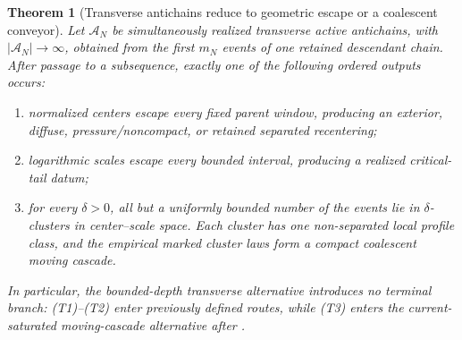 \documentclass[11pt]{amsart}
\numberwithin{equation}{section}
\theoremstyle{plain}
\newtheorem{theorem}{Theorem}[section]
\theoremstyle{definition}
\theoremstyle{remark}
\begin{document}
\begin{theorem}[Transverse antichains reduce to geometric escape or a coalescent conveyor]
\label{thm:transverse-antichain-closure}
Let \(\mathcal A_N\) be simultaneously realized transverse active antichains,
with \(|\mathcal A_N|\to\infty\), obtained from the first \(m_N\) events of
one retained descendant chain.  After passage to a subsequence, exactly one of
the following ordered outputs occurs:
\begin{enumerate}[label=\textup{(T\arabic*)}]
 \item normalized centers escape every fixed parent window, producing an
 exterior, diffuse, pressure/noncompact, or retained separated recentering;
 \item logarithmic scales escape every bounded interval, producing a realized
 critical-tail datum;
 \item for every \(\delta>0\), all but a uniformly bounded number of the
 events lie in \(\delta\)-clusters in center--scale space.  Each cluster has
 one non-separated local profile class, and the empirical marked cluster laws
 form a compact coalescent moving cascade.
\end{enumerate}
In particular, the bounded-depth transverse alternative introduces no
terminal branch: \textup{(T1)}--\textup{(T2)} enter previously defined routes,
while \textup{(T3)} enters the current-saturated moving-cascade alternative
after .
\end{theorem}
\end{document}
